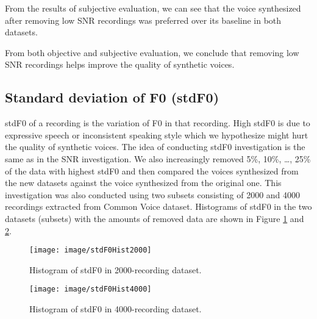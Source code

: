 \documentclass[12pt]{article}
\begin{document}
From the results of subjective evaluation, we can see that the voice synthesized after removing low SNR recordings was preferred over its baseline in both datasets.

From both objective and subjective evaluation, we conclude that removing low SNR recordings helps improve the quality of synthetic voices.

\subsection{Standard deviation of F0 (stdF0)}
stdF0 of a recording is the variation of F0 in that recording. High stdF0 is due to expressive speech or inconsistent speaking style which we hypothesize might hurt the quality of synthetic voices. The idea of conducting stdF0 investigation is the same as in the SNR investigation. We also increasingly removed 5\%, 10\%, …, 25\% of the data with highest stdF0 and then compared the voices synthesized from the new datasets against the voice synthesized from the original one. This investigation was also conducted using two subsets consisting of 2000 and 4000 recordings extracted from Common Voice dataset. Histograms of stdF0 in the two datasets (subsets) with the amounts of removed data are shown in Figure \ref{fig_stdF0Hist2000} and \ref{fig_stdF0Hist4000}.

\begin{figure}[t]
\begin{center}
\texttt{[image: image/stdF0Hist2000]}
\end{center}
\vspace{-0.3cm}
\caption[Histogram of stdF0 in 2000-recording dataset.]{Histogram of stdF0 in 2000-recording dataset.}
\label{fig_stdF0Hist2000}
\end{figure}

\begin{figure}[t]
\begin{center}
\texttt{[image: image/stdF0Hist4000]}
\end{center}
\vspace{-0.3cm}
\caption[Histogram of stdF0 in 4000-recording dataset.]{Histogram of stdF0 in 4000-recording dataset.}
\label{fig_stdF0Hist4000}
\end{figure}
\end{document}
